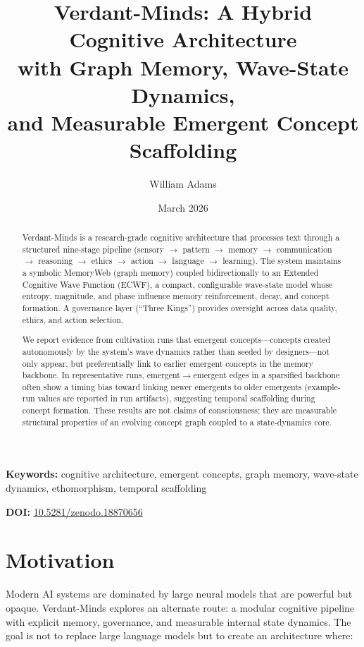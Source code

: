 \documentclass[11pt,a4paper]{article}
\title{%
  \textbf{Verdant-Minds: A Hybrid Cognitive Architecture\\
  with Graph Memory, Wave-State Dynamics,\\
  and Measurable Emergent Concept Scaffolding}%
}
\author[1]{William Adams}
\affil[1]{Independent Researcher}
\date{March 2026}
\begin{document}
\maketitle

\begin{abstract}
Verdant-Minds is a research-grade cognitive architecture that processes text 
through a structured nine-stage pipeline (sensory $\to$ pattern $\to$ memory 
$\to$ communication $\to$ reasoning $\to$ ethics $\to$ action $\to$ language 
$\to$ learning). The system maintains a symbolic MemoryWeb (graph memory) 
coupled bidirectionally to an Extended Cognitive Wave Function (ECWF), a 
compact, configurable wave-state model whose entropy, magnitude, and phase 
influence memory reinforcement, decay, and concept formation. A governance 
layer (``Three Kings'') provides oversight across data quality, ethics, and 
action selection.

We report evidence from cultivation runs that emergent concepts---concepts 
created autonomously by the system's wave dynamics rather than seeded by 
designers---not only appear, but preferentially link to earlier emergent 
concepts in the memory backbone. In representative runs, emergent$\to$emergent edges in a sparsified backbone often show a timing bias toward linking newer emergents to older emergents (example-run values are reported in run artifacts), suggesting temporal scaffolding during concept formation. 
These results are not claims of consciousness; they are measurable structural 
properties of an evolving concept graph coupled to a state-dynamics core.
\end{abstract}

\vspace{1em}
\noindent\textbf{Keywords:} cognitive architecture, emergent concepts, graph memory, 
wave-state dynamics, ethomorphism, temporal scaffolding

\vspace{0.5em}
\noindent\textbf{DOI:} \href{https://doi.org/10.5281/zenodo.18870656}{10.5281/zenodo.18870656}

\section{Motivation}

Modern AI systems are dominated by large neural models that are powerful but 
opaque. Verdant-Minds explores an alternate route: a modular cognitive pipeline 
with explicit memory, governance, and measurable internal state dynamics. The 
goal is not to replace large language models but to create an architecture where:
\end{document}
